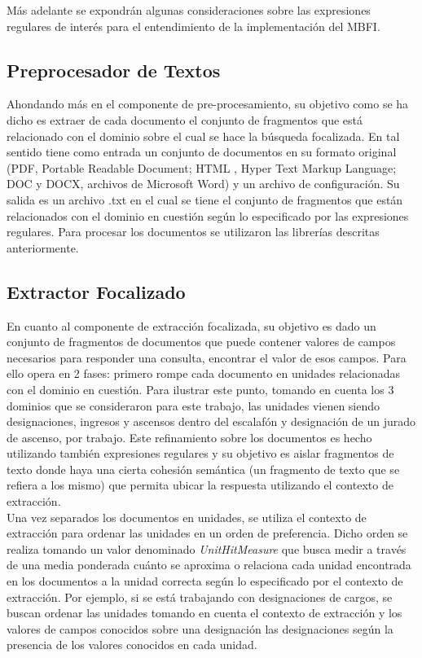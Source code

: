 Más adelante se expondrán algunas consideraciones sobre las expresiones regulares de interés para el entendimiento de la implementación del MBFI. \\

\subsection{Preprocesador de Textos}\label{sect:implementacion-preProcesador}

Ahondando más en el componente de pre-procesamiento, su objetivo como se ha dicho es extraer de cada documento el conjunto de fragmentos que está relacionado con el dominio sobre el cual se hace la búsqueda focalizada. En tal sentido tiene como entrada un conjunto de documentos en su formato original (PDF, Portable Readable Document; HTML , Hyper Text Markup Language; DOC y DOCX, archivos de Microsoft Word) y un archivo de configuración. Su salida es un archivo .txt en el cual se tiene el conjunto de fragmentos que están relacionados con el dominio en cuestión según lo especificado por las expresiones regulares. Para procesar los documentos se utilizaron las librerías descritas anteriormente. \\

\subsection{Extractor Focalizado}\label{sect:implementacion-extractorFocalizado}

En cuanto al componente de extracción focalizada, su objetivo es dado un conjunto de fragmentos de documentos que puede contener valores de campos necesarios para responder una consulta, encontrar el valor de esos campos. Para ello opera en 2 fases: primero rompe cada documento en unidades relacionadas con el dominio en cuestión. Para ilustrar este punto, tomando en cuenta los 3 dominios que se consideraron para este trabajo, las unidades vienen siendo designaciones, ingresos y ascensos dentro del escalafón y designación de un jurado de ascenso, por trabajo. Este refinamiento sobre los documentos es hecho utilizando también expresiones regulares y su objetivo es aislar fragmentos de texto donde haya una cierta cohesión semántica (un fragmento de texto que se refiera a los mismo) que permita ubicar la respuesta utilizando el contexto de extracción. \\

Una vez separados los documentos en unidades, se utiliza el contexto de extracción para ordenar las unidades en un orden de preferencia. Dicho orden se realiza tomando un valor denominado \emph{UnitHitMeasure} que busca medir a través de una media ponderada cuánto se aproxima o relaciona cada unidad encontrada en los documentos a la unidad correcta según lo especificado por el contexto de extracción. Por ejemplo, si se está trabajando con designaciones de cargos, se buscan ordenar las unidades tomando en cuenta el contexto de extracción y los valores de campos conocidos sobre una designación las designaciones según la presencia de los valores conocidos en cada unidad.\\


